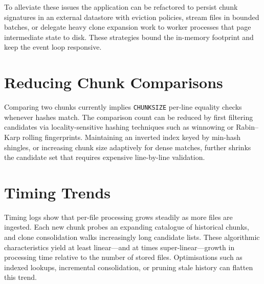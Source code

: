 \documentclass[11pt]{article}
\begin{document}
To alleviate these issues the application can be refactored to persist chunk signatures in an external datastore with eviction policies, stream files in bounded batches, or delegate heavy clone expansion work to worker processes that page intermediate state to disk. These strategies bound the in-memory footprint and keep the event loop responsive.

\section*{Reducing Chunk Comparisons}
Comparing two chunks currently implies \texttt{CHUNKSIZE} per-line equality checks whenever hashes match. The comparison count can be reduced by first filtering candidates via locality-sensitive hashing techniques such as winnowing or Rabin--Karp rolling fingerprints. Maintaining an inverted index keyed by min-hash shingles, or increasing chunk size adaptively for dense matches, further shrinks the candidate set that requires expensive line-by-line validation.

\section*{Timing Trends}
Timing logs show that per-file processing grows steadily as more files are ingested. Each new chunk probes an expanding catalogue of historical chunks, and clone consolidation walks increasingly long candidate lists. These algorithmic characteristics yield at least linear---and at times super-linear---growth in processing time relative to the number of stored files. Optimisations such as indexed lookups, incremental consolidation, or pruning stale history can flatten this trend.
\end{document}
